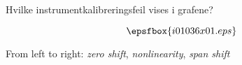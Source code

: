 


Hvilke instrumentkalibreringsfeil vises i grafene?

$$\epsfbox{i01036x01.eps}$$







 






From left to right: {\it zero shift}, {\it nonlinearity}, {\it span shift}




